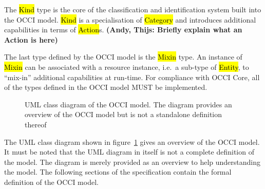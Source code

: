 \documentclass[10pt,a4paper]{article}
\begin{document}
The \hl{Kind} type is the core of the classification and identification
system built into the OCCI model. \hl{Kind} is a specialisation of
\hl{Category} and introduces additional capabilities in terms of \hl{Action}s.
\textbf{(Andy, Thijs: Briefly explain what an Action is here)}

The last type defined by the OCCI model is the \hl{Mixin} type. An instance of
\hl{Mixin} can be associated with a resource instance, i.e.~a sub-type of
\hl{Entity}, to ``mix-in'' additional capabilities at run-time.
%
For compliance with OCCI Core, all of the types defined in the OCCI model MUST
be implemented.

\begin{figure}[!h]
{\centering {} \par}
\caption{UML class diagram of the OCCI model. The diagram provides an
overview of the OCCI model but is not a standalone definition thereof}
\label{fig:occi_model}
\end{figure}

The UML class diagram shown in figure~\ref{fig:occi_model} gives an overview of
the OCCI model. It must be noted that the UML diagram in itself is not a
complete definition of the model. The diagram is merely provided as an overview
to help understanding the model.  The following sections of the specification
contain the formal definition of the OCCI model.
\end{document}
